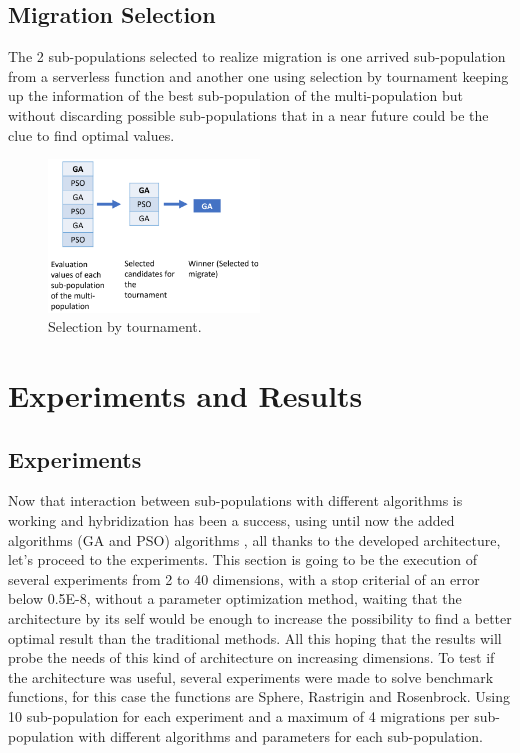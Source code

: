 \documentclass[runningheads]{llncs}
\begin{document}
  \subsection{Migration Selection} The 2 sub-populations selected to realize migration is one arrived sub-population from a serverless function and another one 
  using selection by tournament keeping up the information of the best
  sub-population of the multi-population but without discarding possible sub-populations that in a near future could be the clue to find optimal values.

\begin{figure}[htp]
  \centering
  \includegraphics[width=0.5\textwidth]{img/selection.png}
  \caption{Selection by tournament.} \label{fig5}
  \end{figure}


\section{Experiments and Results}
\subsection{Experiments}
Now that interaction between sub-populations with different algorithms is
working and hybridization has been a success, using until now the added
algorithms (GA and PSO) algorithms \cite{Kramer2017,Guerrero2017,Lalwani2019}, all thanks to the developed architecture,
let's proceed to the experiments. This section is going to be the execution of
several experiments from 2 to 40 dimensions, with a stop criterial of an error
below 0.5E-8, without a parameter optimization method, waiting that the
architecture by its self would be enough to increase the possibility to find a
better optimal result than the traditional methods. All this hoping that the
results will probe the needs of this kind of architecture on increasing
dimensions. To test if the architecture was useful, several experiments were
made to solve benchmark functions, for this case the functions are Sphere,
Rastrigin and Rosenbrock. Using 10 sub-population for each experiment and
a maximum of 4 migrations per sub-population with different algorithms and parameters
for each sub-population.
\end{document}
